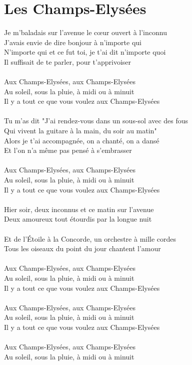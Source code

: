\section*{Les Champs-Elysées}
Je m'baladais sur l'avenue le cœur ouvert à l'inconnu\\
J'avais envie de dire bonjour à n'importe qui\\
N'importe qui et ce fut toi, je t'ai dit n'importe quoi\\
Il suffisait de te parler, pour t'apprivoiser\\\\
Aux Champs-Elysées, aux Champs-Elysées\\
Au soleil, sous la pluie, à midi ou à minuit\\
Il y a tout ce que vous voulez aux Champs-Elysées\\\\
Tu m'as dit "J'ai rendez-vous dans un sous-sol avec des fous\\
Qui vivent la guitare à la main, du soir au matin"\\
Alors je t'ai accompagnée, on a chanté, on a dansé\\
Et l'on n'a même pas pensé à s'embrasser\\\\
Aux Champs-Elysées, aux Champs-Elysées\\
Au soleil, sous la pluie, à midi ou à minuit\\
Il y a tout ce que vous voulez aux Champs-Elysées\\\\
Hier soir, deux inconnus et ce matin sur l'avenue\\
Deux amoureux tout étourdis par la longue nuit\\\\
Et de l'Étoile à la Concorde, un orchestre à mille cordes\\
Tous les oiseaux du point du jour chantent l'amour\\\\
Aux Champs-Elysées, aux Champs-Elysées\\
Au soleil, sous la pluie, à midi ou à minuit\\
Il y a tout ce que vous voulez aux Champs-Elysées\\\\
Aux Champs-Elysées, aux Champs-Elysées\\
Au soleil, sous la pluie, à midi ou à minuit\\
Il y a tout ce que vous voulez aux Champs-Elysées\\\\
Aux Champs-Elysées, aux Champs-Elysées\\
Au soleil, sous la pluie, à midi ou à minuit\\
